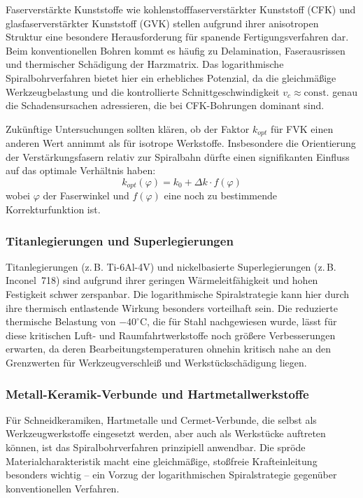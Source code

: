 ﻿\documentclass[12pt,a4paper]{article}
\begin{document}
Faserverstärkte Kunststoffe wie kohlenstofffaserverstärkter Kunststoff (CFK) und glasfaserverstärkter Kunststoff (GVK) stellen aufgrund ihrer anisotropen Struktur eine besondere Herausforderung für spanende Fertigungsverfahren dar. Beim konventionellen Bohren kommt es häufig zu Delamination, Faserausrissen und thermischer Schädigung der Harzmatrix. Das logarithmische Spiralbohrverfahren bietet hier ein erhebliches Potenzial, da die gleichmäßige Werkzeugbelastung und die kontrollierte Schnittgeschwindigkeit $v_c \approx \text{const.}$ genau die Schadensursachen adressieren, die bei CFK-Bohrungen dominant sind.

Zukünftige Untersuchungen sollten klären, ob der Faktor $k_{opt}$ für FVK einen anderen Wert annimmt als für isotrope Werkstoffe. Insbesondere die Orientierung der Verstärkungsfasern relativ zur Spiralbahn dürfte einen signifikanten Einfluss auf das optimale Verhältnis haben:
\begin{equation}
    k_{opt}(\varphi) = k_0 + \Delta k \cdot f(\varphi)
\end{equation}
wobei $\varphi$ der Faserwinkel und $f(\varphi)$ eine noch zu bestimmende Korrekturfunktion ist.

\subsubsection{Titanlegierungen und Superlegierungen}

Titanlegierungen (z.\,B. Ti-6Al-4V) und nickelbasierte Superlegierungen (z.\,B. Inconel~718) sind aufgrund ihrer geringen Wärmeleitfähigkeit und hohen Festigkeit schwer zerspanbar. Die logarithmische Spiralstrategie kann hier durch ihre thermisch entlastende Wirkung besonders vorteilhaft sein. Die reduzierte thermische Belastung von $-40^\circ\text{C}$, die für Stahl nachgewiesen wurde, lässt für diese kritischen Luft- und Raumfahrtwerkstoffe noch größere Verbesserungen erwarten, da deren Bearbeitungstemperaturen ohnehin kritisch nahe an den Grenzwerten für Werkzeugverschleiß und Werkstückschädigung liegen.

\subsubsection{Metall-Keramik-Verbunde und Hartmetallwerkstoffe}

Für Schneidkeramiken, Hartmetalle und Cermet-Verbunde, die selbst als Werkzeugwerkstoffe eingesetzt werden, aber auch als Werkstücke auftreten können, ist das Spiralbohrverfahren prinzipiell anwendbar. Die spröde Materialcharakteristik macht eine gleichmäßige, stoßfreie Krafteinleitung besonders wichtig -- ein Vorzug der logarithmischen Spiralstrategie gegenüber konventionellen Verfahren.
\end{document}
